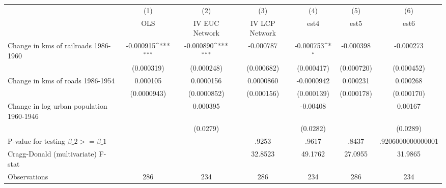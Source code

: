 {
\def\sym#1{\ifmmode^{#1}\else\(^{#1}\)\fi}
\begin{tabular}{l*{6}{c}}
\hline\hline
                &\multicolumn{1}{c}{(1)}&\multicolumn{1}{c}{(2)}&\multicolumn{1}{c}{(3)}&\multicolumn{1}{c}{(4)}&\multicolumn{1}{c}{(5)}&\multicolumn{1}{c}{(6)}\\
                &\multicolumn{1}{c}{OLS}&\multicolumn{1}{c}{IV EUC Network}&\multicolumn{1}{c}{IV LCP Network}&\multicolumn{1}{c}{est4}&\multicolumn{1}{c}{est5}&\multicolumn{1}{c}{est6}\\
\hline
Change in kms of railroads 1986-1960&-0.000915\sym{***}&-0.000890\sym{***}&-0.000787         &-0.000753\sym{*}  &-0.000398         &-0.000273         \\
                &(0.000319)         &(0.000248)         &(0.000682)         &(0.000417)         &(0.000720)         &(0.000452)         \\
[1em]
Change in kms of roads 1986-1954& 0.000105         &0.0000156         &0.0000860         &-0.0000942         & 0.000231         & 0.000268         \\
                &(0.0000943)         &(0.0000852)         &(0.000156)         &(0.000139)         &(0.000178)         &(0.000170)         \\
[1em]
Change in log urban population 1960-1946&                  & 0.000395         &                  & -0.00408         &                  &  0.00167         \\
                &                  & (0.0279)         &                  & (0.0282)         &                  & (0.0289)         \\
\hline
P-value for testing $\beta\_{2} >= \beta\_{1}$&                  &                  &    .9253         &    .9617         &    .8437         &.9206000000000001         \\
Cragg-Donald (multivariate) F-stat&                  &                  &  32.8523         &  49.1762         &  27.0955         &  31.9865         \\
Observations    &      286         &      234         &      286         &      234         &      286         &      234         \\
\hline\hline
\end{tabular}
}
